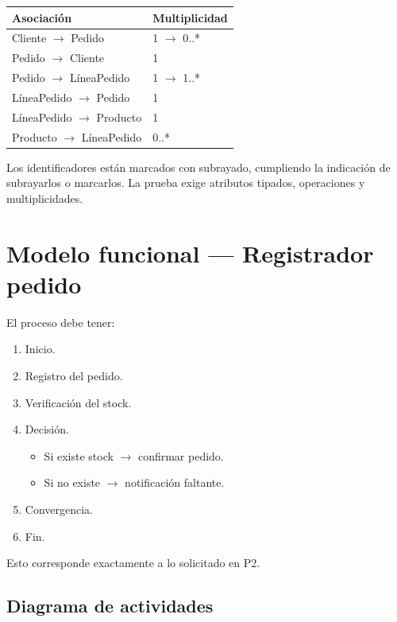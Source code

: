 \documentclass[12pt,a4paper]{article}
\begin{document}
\begin{center}
\begin{tabular}{ll}
\toprule
\textbf{Asociación} & \textbf{Multiplicidad} \\
\midrule
Cliente $\rightarrow$ Pedido & 1 $\rightarrow$ 0..* \\
Pedido $\rightarrow$ Cliente & 1 \\
Pedido $\rightarrow$ LíneaPedido & 1 $\rightarrow$ 1..* \\
LíneaPedido $\rightarrow$ Pedido & 1 \\
LíneaPedido $\rightarrow$ Producto & 1 \\
Producto $\rightarrow$ LíneaPedido & 0..* \\
\bottomrule
\end{tabular}
\end{center}

Los identificadores están marcados con subrayado, cumpliendo la indicación de subrayarlos o marcarlos. La prueba exige atributos tipados, operaciones y multiplicidades.

\section{Modelo funcional --- Registrador pedido}

El proceso debe tener:

\begin{enumerate}[nosep]
    \item Inicio.
    \item Registro del pedido.
    \item Verificación del stock.
    \item Decisión.
    \begin{itemize}[nosep]
        \item Si existe stock $\rightarrow$ confirmar pedido.
        \item Si no existe $\rightarrow$ notificación faltante.
    \end{itemize}
    \item Convergencia.
    \item Fin.
\end{enumerate}

Esto corresponde exactamente a lo solicitado en P2.

\subsection*{Diagrama de actividades}
\end{document}
